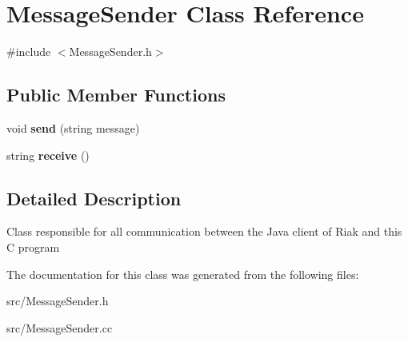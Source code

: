 \hypertarget{classMessageSender}{
\section{MessageSender Class Reference}
\label{classMessageSender}
}


{\ttfamily \#include $<$MessageSender.h$>$}\subsection*{Public Member Functions}
\begin{DoxyCompactItemize}
\item 
\hypertarget{classMessageSender_a9ed57cadd9393eca2b12f4cd51dbc8d2}{
void {\bfseries send} (string message)}
\label{classMessageSender_a9ed57cadd9393eca2b12f4cd51dbc8d2}

\item 
\hypertarget{classMessageSender_a89e7662e7e831865e8e9d1d602579418}{
string {\bfseries receive} ()}
\label{classMessageSender_a89e7662e7e831865e8e9d1d602579418}

\end{DoxyCompactItemize}


\subsection{Detailed Description}
Class responsible for all communication between the Java client of Riak and this C program 

The documentation for this class was generated from the following files:\begin{DoxyCompactItemize}
\item 
src/MessageSender.h\item 
src/MessageSender.cc\end{DoxyCompactItemize}
